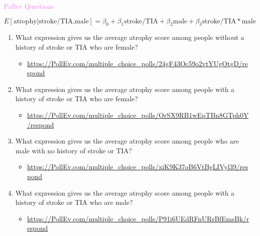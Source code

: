 \documentclass[10pt,t]{beamer}
\begin{document}
\begin{frame}{\textcolor{violet}{Pollev Questions}}
	
	\vspace{-10 mm}
	\small
	\[E[\text{atrophy}|\text{stroke/TIA,male}]=\beta_0+\beta_1\text{stroke/TIA}+\beta_2\text{male}+{\beta_3}\text{stroke/TIA}*\text{male}\]
	
	\normalsize
	\smallskip
	\begin{enumerate}
		\item What expression gives us the average atrophy score among people without a history of stroke or TIA who are female?
		\begin{itemize}
			\smallskip
			\item{\tiny\url{https://PollEv.com/multiple_choice_polls/24gF43Oc59o2vtYUgOtgD/respond}}\pause
		\end{itemize}
		\medskip
		\item What expression gives us the average atrophy score among people with a history of stroke or TIA who are female?
		\begin{itemize}
			\smallskip
			\item{\tiny\url{https://PollEv.com/multiple_choice_polls/OrSX9RB1wEpTBn8GTph0Y/respond}}\pause
		\end{itemize}
	\medskip
	\item What expression gives us the average atrophy score among people who are male with no history of stroke or TIA?
	\begin{itemize}
		\smallskip
		\item{\tiny\url{https://PollEv.com/multiple_choice_polls/xiK9K37oB6VtBgLIVyl39/respond}}\pause
	\end{itemize}
\medskip
	\item What expression gives us the average atrophy score among people with a history of stroke or TIA who are male?
	\begin{itemize}
		\smallskip
		\item{\tiny\url{https://PollEv.com/multiple_choice_polls/P91i6UEdRFnURrBfEmsBk/respond}}\pause
	\end{itemize}
	\end{enumerate}
	
	
\end{frame}
\end{document}
